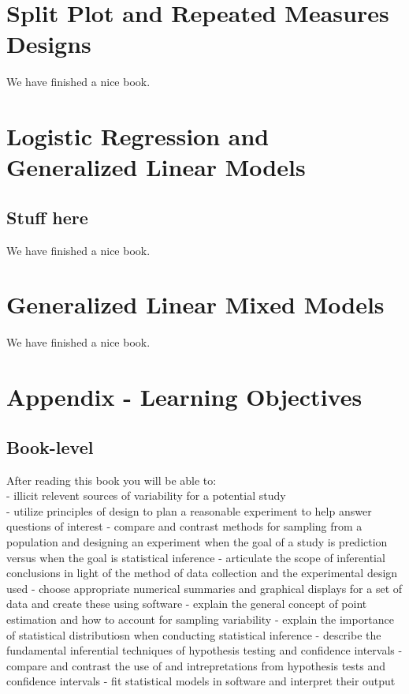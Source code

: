 \documentclass[]{book}
\begin{document}
\chapter{Split Plot and Repeated Measures
Designs}\label{repeatedmeasures}

We have finished a nice book.

\chapter{Logistic Regression and Generalized Linear
Models}\label{logistic}

\section{Stuff here}\label{stuff-here}

We have finished a nice book.

\chapter{Generalized Linear Mixed Models}\label{glmm}

We have finished a nice book.

\chapter{Appendix - Learning Objectives}\label{learningobj}

\section{Book-level}\label{book-level}

After reading this book you will be able to:\\
- illicit relevent sources of variability for a potential study\\
- utilize principles of design to plan a reasonable experiment to help
answer questions of interest - compare and contrast methods for sampling
from a population and designing an experiment when the goal of a study
is prediction versus when the goal is statistical inference - articulate
the scope of inferential conclusions in light of the method of data
collection and the experimental design used - choose appropriate
numerical summaries and graphical displays for a set of data and create
these using software - explain the general concept of point estimation
and how to account for sampling variability - explain the importance of
statistical distributiosn when conducting statistical inference -
describe the fundamental inferential techniques of hypothesis testing
and confidence intervals - compare and contrast the use of and
intrepretations from hypothesis tests and confidence intervals - fit
statistical models in software and interpret their output
\end{document}
